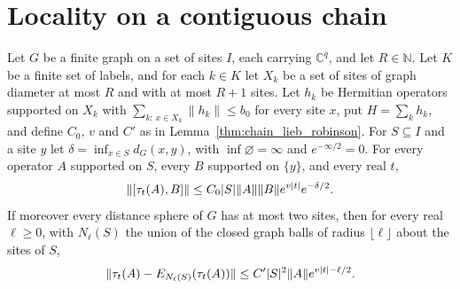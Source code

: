 \section{Locality on a contiguous chain}

\begin{lemma}
    \label{thm:graph_lieb_robinson_two_spheres}
    \leanok
    Let $G$ be a finite graph on a set of sites $I$, each carrying
    $\mathbb C^q$, and let $R\in\mathbb N$. Let $K$ be a finite set of
    labels, and for each $k\in K$ let $X_k$ be a set of sites of
    graph diameter at most $R$ and with at most $R+1$ sites. Let $h_k$ be
    Hermitian operators supported on $X_k$ with
    $\sum_{k:\,x\in X_k}\|h_k\|\le b_0$ for every site $x$, put
    $H=\sum_kh_k$, and define $C_0$, $v$ and $C'$ as in
    Lemma~\ref{thm:chain_lieb_robinson}. For $S\subseteq I$ and a site $y$
    let $\delta=\inf_{x\in S}d_G(x,y)$, with $\inf\varnothing=\infty$ and
    $e^{-\infty/2}=0$. For every operator $A$ supported on $S$, every $B$
    supported on $\{y\}$, and every real $t$,
    \begin{align}
        \|[\tau_t(A),B]\|
        \le C_0|S|\|A\|\|B\|e^{v|t|}e^{-\delta/2}.\notag
    \end{align}
    If moreover every distance sphere of $G$ has at most two sites, then for
    every real $\ell\ge0$, with $N_\ell(S)$ the union of the closed graph
    balls of radius $\lfloor\ell\rfloor$ about the sites of $S$,
    \begin{align}
        \|\tau_t(A)-E_{N_\ell(S)}(\tau_t(A))\|
        \le C'|S|^2\|A\|e^{v|t|-\ell/2}.\notag
    \end{align}
\end{lemma}

